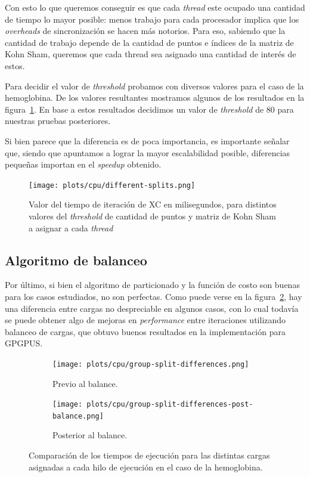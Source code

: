 Con esto lo que queremos conseguir es que cada \textit{thread} este ocupado una
cantidad de tiempo lo mayor posible: menos trabajo para cada procesador implica
que los \textit{overheads} de sincronizaci\'on se hacen m\'as notorios. Para eso,
sabiendo que la cantidad de trabajo depende de la cantidad de puntos e \'indices
de la matriz de Kohn Sham, queremos que cada thread sea asignado una cantidad de
inter\'es de estos.

Para decidir el valor de \textit{threshold} probamos con diversos valores para
el caso de la hemoglobina. De los valores resultantes mostramos algunos de los
resultados en la figura~\ref{fig:split-hemo}. En base a estos resultados decidimos
un valor de \textit{threshold} de 80 para nuestras pruebas posteriores.

Si bien parece que la diferencia es de poca importancia, es importante se\~nalar
que, siendo que apuntamos a lograr la mayor escalabilidad posible, diferencias
peque\~nas importan en el \textit{speedup} obtenido.

\begin{figure}[htbp]
   \centering
   \texttt{[image: plots/cpu/different-splits.png]}
   \caption{Valor del tiempo de iteraci\'on de XC en milisegundos, para distintos
   valores del \textit{threshold} de cantidad de puntos y matriz de Kohn Sham
   a asignar a cada \textit{thread}}
   \label{fig:split-hemo}
\end{figure}

\subsection{Algoritmo de balanceo}

Por \'ultimo, si bien el algoritmo de particionado y la funci\'on de costo son
buenas para los casos estudiados, no son perfectas. Como puede verse en la
figura~\ref{fig:lio-imbalance-between-loads}, hay una diferencia entre cargas
no despreciable en algunos casos, con lo cual todav\'ia se puede obtener algo de
mejoras en \textit{performance} entre iteraciones utilizando balanceo de cargas,
que obtuvo buenos resultados en la implementaci\'on para GPGPUS.

\begin{figure}[htbp]
   \centering
   \begin{subfigure}[b]{\plotwidthtres}
     \texttt{[image: plots/cpu/group-split-differences.png]}
     \caption{Previo al balance.}
     \label{fig:lio-imbalance-between-loads}
   \end{subfigure}
   \begin{subfigure}[b]{\plotwidthtres}
     \texttt{[image: plots/cpu/group-split-differences-post-balance.png]}
     \caption{Posterior al balance.}
     \label{fig:lio-imbalance-fixed}
   \end{subfigure}
   \caption{Comparaci\'on de los tiempos de ejecuci\'on para las distintas
   cargas asignadas a cada hilo de ejecuci\'on en el caso de la hemoglobina.}
   \label{fig:lio-imbalance}
\end{figure}

